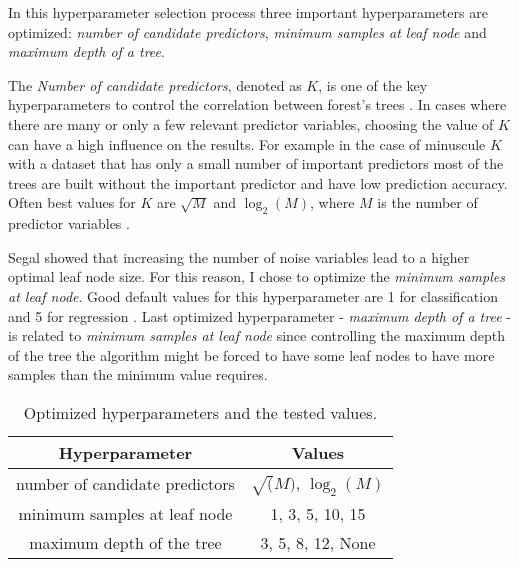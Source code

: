 In this hyperparameter selection process three important hyperparameters are optimized: \textit{number of candidate predictors}, \textit{minimum samples at leaf node} and \textit{maximum depth of a tree}.

The \textit{Number of candidate predictors}, denoted as $K$, is one of the key hyperparameters to control the correlation between forest's trees \cite{probst2018hyperparameters}.
In cases where there are many or only a few relevant predictor variables, choosing the value of $K$ can have a high influence on the results. For example in the case of minuscule $K$ with a dataset that has only a small number of important predictors most of the trees are built without the important predictor and have low prediction accuracy. \cite{bernard2009influence} Often best values for $K$ are $\sqrt{M}$ and $\log_2(M)$, where $M$ is the number of predictor variables \cite{bernard2009influence}.

Segal \cite{segal2004machine} showed that increasing the number of noise variables lead to a higher optimal leaf node size. For this reason, I chose to optimize the \textit{minimum samples at leaf node}. Good default values for this hyperparameter are 1 for classification and 5 for regression \cite{probst2018hyperparameters}. Last optimized hyperparameter - \textit{maximum depth of a tree} - is related to \textit{minimum samples at leaf node} since controlling the maximum depth of the tree the algorithm might be forced to have some leaf nodes to have more samples than the minimum value requires.

\begin{table}
    \caption{Optimized hyperparameters and the tested values.}
    \begin{tabular}{ | c | c |}
    \hline
    Hyperparameter & Values\\
    \hline
    number of candidate predictors & $\sqrt(M)$, $\log_2(M)$\\
    minimum samples at leaf node & 1, 3, 5, 10, 15\\
    maximum depth of the tree & 3, 5, 8, 12, None\\
    \hline
   \end{tabular}
   \label{tab:hyperparam}
\end{table}

